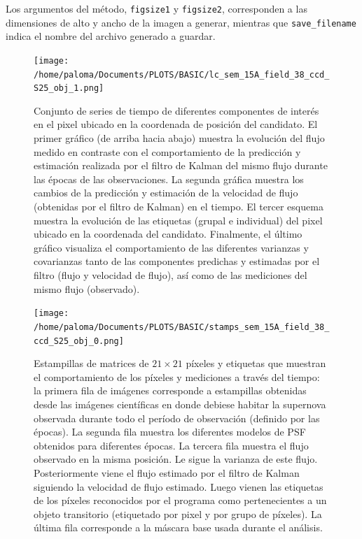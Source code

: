 \begin{itemize}
Los argumentos del m\'etodo, \texttt{figsize1} y \texttt{figsize2}, corresponden a las dimensiones de alto y ancho de la imagen a generar, mientras que \texttt{save\_filename} indica el nombre del archivo generado a guardar.  
\end{itemize}

\begin{figure}[h!]
\centering
\texttt{[image: /home/paloma/Documents/PLOTS/BASIC/lc\_sem\_15A\_field\_38\_ccd\_S25\_obj\_1.png]}
\caption{Conjunto de series de tiempo de diferentes componentes de inter\'es en el pixel ubicado en la coordenada de posici\'on del candidato. El primer gr\'afico (de arriba hacia abajo) muestra la evoluci\'on del flujo medido en contraste con el comportamiento de la predicci\'on y estimaci\'on realizada por el filtro de Kalman del mismo flujo durante las \'epocas de las observaciones. La segunda gr\'afica muestra los cambios de la predicci\'on y estimaci\'on de la velocidad de flujo (obtenidas por el filtro de Kalman) en el tiempo. El tercer esquema muestra la evoluci\'on de las etiquetas (grupal e individual) del pixel ubicado en la coordenada del candidato. Finalmente, el \'ultimo gr\'afico visualiza el comportamiento de las diferentes varianzas y covarianzas tanto de las componentes predichas y estimadas por el filtro (flujo y velocidad de flujo), as\'i como de las mediciones del mismo flujo (observado).}
\label{fig:lc_result}
\end{figure}

\begin{figure}[h!]
\centering
\texttt{[image: /home/paloma/Documents/PLOTS/BASIC/stamps\_sem\_15A\_field\_38\_ccd\_S25\_obj\_0.png]}
\caption{Estampillas de matrices de $21 \times 21$ p\'ixeles y etiquetas que muestran el comportamiento de los p\'ixeles y mediciones a trav\'es del tiempo: la primera fila de im\'agenes corresponde a estampillas obtenidas desde las im\'agenes cient\'ificas en donde debiese habitar la supernova observada durante todo el per\'iodo de observaci\'on (definido por las \'epocas). La segunda fila muestra los diferentes modelos de PSF obtenidos para diferentes \'epocas. La tercera fila muestra el flujo observado en la misma posici\'on. Le sigue la varianza de este flujo. Posteriormente viene el flujo estimado por el filtro de Kalman siguiendo la velocidad de flujo estimado. Luego vienen las etiquetas de los p\'ixeles reconocidos por el programa como pertenecientes a un objeto transitorio (etiquetado por pixel y por grupo de p\'ixeles). La \'ultima fila corresponde a la m\'ascara base usada durante el an\'alisis.}
\label{fig:stamps_result}
\end{figure}
\bigskip


